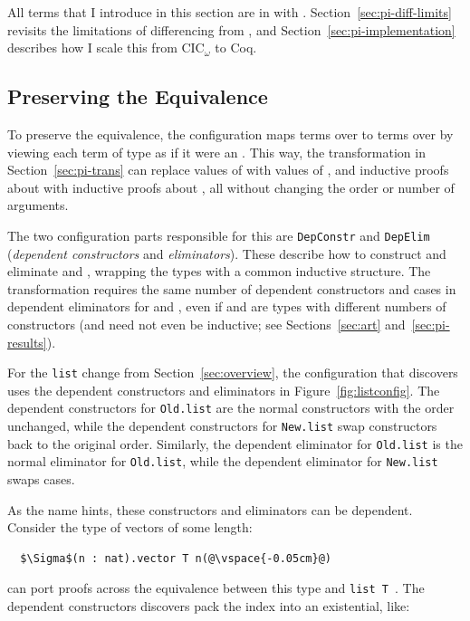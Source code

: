 All terms that I introduce in this section are in  with . %
Section~\ref{sec:pi-diff-limits} revisits the limitations of differencing from \sysname, 
and Section~\ref{sec:pi-implementation} describes how I scale this from CIC$_{\omega}$ to Coq.

\subsection{Preserving the Equivalence}
\label{sec:pi-diff-equiv}

To preserve the equivalence, the configuration maps terms over \Aa to terms over \B by viewing each
term of type \B as if it were an \Aa.
This way, the transformation in Section~\ref{sec:pi-trans} can replace values of \Aa with values of \B, and
inductive proofs about \Aa with inductive proofs about \B, %
all without changing the order or number of arguments.

The two configuration parts responsible for this are \lstinline{DepConstr}
and \lstinline{DepElim} (\textit{dependent constructors} and \textit{eliminators}).
These describe how to construct and eliminate \Aa and \B, wrapping the types with a common inductive structure.
The transformation requires the same number of dependent constructors and cases in dependent eliminators for \Aa and \B,
even if \Aa and \B are types with different numbers of constructors
(\Aa and \B need not even be inductive; see Sections~\ref{sec:art} and~\ref{sec:pi-results}).

For the \lstinline{list} change from Section~\ref{sec:overview},
the configuration that \toolnamec discovers uses the dependent constructors
and eliminators in Figure~\ref{fig:listconfig}. The dependent constructors for \lstinline{Old.list}
are the normal constructors with the order unchanged,
while the dependent constructors for \lstinline{New.list} swap constructors
back to the original order.
Similarly, the dependent eliminator for \lstinline{Old.list} is the normal eliminator for \lstinline{Old.list},
while the dependent eliminator for \lstinline{New.list} swaps cases.

As the name hints, these constructors and eliminators can be dependent.
Consider the type of vectors of some length:

\begin{lstlisting}
  $\Sigma$(n : nat).vector T n(@\vspace{-0.05cm}@)
\end{lstlisting}
\toolnamec can port proofs across the equivalence between this type and \lstinline{list T}~\href{https://github.com/uwplse/pumpkin-pi/blob/v2.0.0/plugin/coq/examples/Example.v}{}. %
The dependent constructors \toolnamec discovers pack the index into an existential, like:

